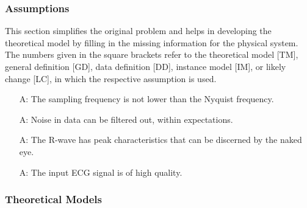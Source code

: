 \documentclass[12pt]{article}
\begin{document}

\subsubsection{Assumptions} \label{sec_assumpt}

This section simplifies the original problem and helps in developing the
theoretical model by filling in the missing information for the physical system.
The numbers given in the square brackets refer to the theoretical model [TM],
general definition [GD], data definition [DD], instance model [IM], or likely
change [LC], in which the respective assumption is used.

\begin{itemize}

\item[A\refstepcounter{assumpnum}\theassumpnum \label{A_Nq_frequency}:] The
sampling frequency is not lower than the Nyquist frequency.

\item[A\refstepcounter{assumpnum}\theassumpnum \label{A_filtered_out}:] Noise in
data can be filtered out, within expectations.

\item[A\refstepcounter{assumpnum}\theassumpnum \label{A_naked_eye}:] The R-wave
has peak characteristics that can be discerned by the naked eye.

\item[A\refstepcounter{assumpnum}\theassumpnum \label{A_high_quality}:] The
input ECG signal is of high quality.

\end{itemize}

\newpage

\subsubsection{Theoretical Models}\label{sec_theoretical}
\end{document}
